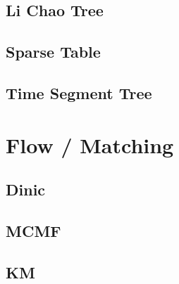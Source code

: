 \documentclass[a4paper,10pt,twocolumn,oneside,x11names]{article}
\begin{document}
\subsection{Li Chao Tree}


\subsection{Sparse Table}


\subsection{Time Segment Tree}




%

\section{Flow / Matching}

\subsection{Dinic}


%

\subsection{MCMF}


\subsection{KM}

\end{document}
